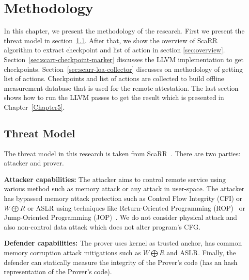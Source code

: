 
\chapter{Methodology} %

\label{Chapter4} %

In this chapter, we present the methodology of the research. First we present
the threat model in section~\ref{sec:threat-model}.  After that, we show the
overview of ScaRR algorithm to extract checkpoint and list of action in section
\ref{sec:overview}. Section~\ref{sec:scarr-checkpoint-marker} discusses the LLVM
implementation to get checkpoints. Section~\ref{sec:scarr-loa-collector}
discusses on methodology of getting list of actions.  
Checkpoints and list of actions are collected to build offline measurement
database that is used for the remote attestation. The last section shows how to
run the LLVM passes to get the result which is presented in
Chapter~\ref{Chapter5}.

\section{Threat Model}
\label{sec:threat-model}

The threat model in this research is taken from
ScaRR~\cite{toffaliniScaRRScalableRuntime2019}. There are two parties: attacker
and prover. 

\vspace{0.5cm}
\noindent \textbf{Attacker capabilities:} The attacker aims to control remote
service using various method such as memory attack or any attack in user-space.
The attacker has bypassed memory attack protection such as Control Flow
Integrity (CFI) or \( W \bigoplus R \) or ASLR using techniques like
Return-Oriented Programming
(ROP)~\cite{roemerReturnorientedProgrammingSystems2012} or Jump-Oriented
Programming (JOP)~\cite{bletschJumpOrientedProgrammingNew2011}. We do not
consider physical attack and also non-control data attack which does not alter
program's CFG.

\vspace{0.5cm}
\noindent \textbf{Defender capabilities:} The prover uses kernel as trusted
anchor, has common memory corruption attack mitigations such as \( W \bigoplus R
\) and ASLR. Finally, the defender can statically measure the integrity of the
Prover's code (\ie has an hash representation of the Prover's code).


